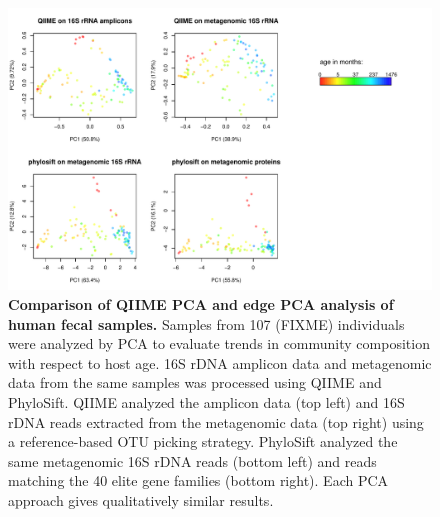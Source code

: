 \documentclass[10pt]{article}
\begin{document}
\begin{figure}[hp]
\begin{center}
\includegraphics[width=6in]{figures/allofem.pdf}
\end{center}
\caption{\textbf{Comparison of QIIME PCA and edge PCA analysis of human fecal samples.} Samples from 107 (FIXME) individuals were analyzed by PCA to evaluate trends in community composition with respect to host age. 16S rDNA amplicon data and metagenomic data from the same samples was processed using QIIME and PhyloSift. QIIME analyzed the amplicon data (top left) and 16S rDNA reads extracted from the metagenomic data (top right) using a reference-based OTU picking strategy. PhyloSift analyzed the same metagenomic 16S rDNA reads (bottom left) and reads matching the 40 elite gene families (bottom right). Each PCA approach gives qualitatively similar results.}
\label{fig:agepca}
\end{figure}
\end{document}
